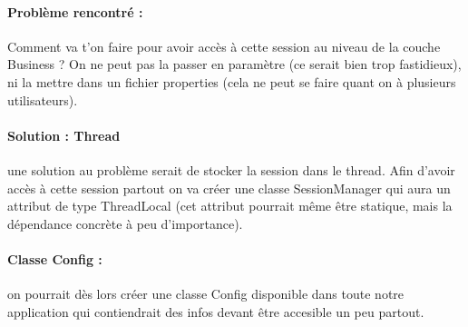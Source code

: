 \documentclass{article}[12pt]
\begin{document}
\paragraph{Problème rencontré : } Comment va t'on faire pour avoir accès à cette session au niveau de la couche Business ? On ne peut pas la passer en paramètre (ce serait bien trop fastidieux), ni la mettre dans un fichier properties (cela ne peut se faire quant on à plusieurs utilisateurs).
\paragraph{Solution : Thread} une solution au problème serait de stocker la session dans le thread. Afin d'avoir accès à cette session partout on va créer une classe SessionManager qui aura un attribut de type ThreadLocal (cet attribut pourrait même être statique, mais la dépendance concrète à peu d'importance). 
\paragraph{Classe Config : } on pourrait dès lors créer une classe Config disponible dans toute notre application qui contiendrait des infos devant être accesible un peu partout. 
\end{document}
